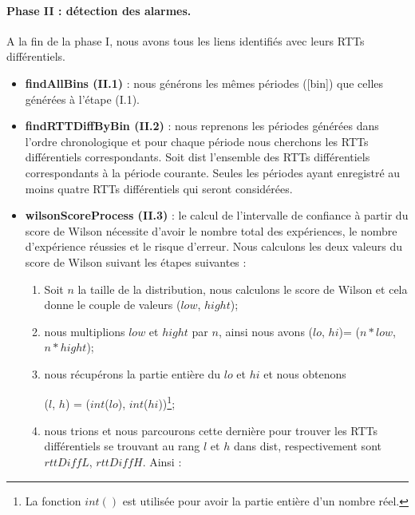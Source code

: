 \begin{itemize}
	
	
	
\end{itemize}

\paragraph{ Phase II : détection des alarmes.}

A la fin de la phase I, nous avons tous les liens identifiés avec leurs
RTTs différentiels. 

\begin{itemize}
	
	\item \textbf{findAllBins (II.1)} : nous générons les mêmes périodes  ({\color{gray}[bin]}) que celles générées à
	l'étape (I.1).
	\item \textbf{ findRTTDiffByBin (II.2)} : nous reprenons les périodes générées dans l'ordre chronologique et
	pour chaque période nous cherchons les RTTs différentiels correspondants. Soit  {\color{gray}dist} l'ensemble des RTTs différentiels correspondants à la période courante.
	Seules les périodes ayant enregistré au moins  quatre RTTs différentiels qui  seront considérées.
	\item \textbf{ wilsonScoreProcess (II.3)} : le calcul de l'intervalle de confiance à partir du score de Wilson nécessite d'avoir le nombre total des expériences, le nombre d'expérience réussies et  le risque d'erreur. Nous calculons les deux valeurs du score de Wilson suivant les étapes suivantes :
	
	\begin{enumerate}
		\item Soit $n$ la taille de la distribution, nous calculons le score de Wilson et cela donne le couple de valeurs ($ low $, $ hight $);
		\item nous multiplions $ low $ et $ hight $ par  $n$, ainsi nous avons ($ lo $, $ hi $)=  ($ n*low $, $ n*hight $);
		\item nous récupérons la partie entière du  $ lo $ et $ hi $ et  nous obtenons
		
		($l$, $h$) = ($ int $($ lo $), $ int $($ hi $))\footnote{La fonction $  int() $ est utilisée pour avoir la partie entière d'un nombre réel.};
		\item  nous trions  {\color{gray}{dist}}  et nous parcourons cette dernière pour trouver les RTTs différentiels  se trouvant au rang $  l $ et $ h $ dans {\color{gray}dist}, respectivement sont $ rttDiffL $, $ rttDiffH $. Ainsi :
		

\end{enumerate}
\end{itemize}
